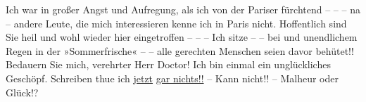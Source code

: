\pstart
           Ich war in großer Angst und {\pb}Aufregung, als ich von der Pariser\label{K_L03695-2v}\label{K_L03695-2} fürchtend – – – na – andere Leute, die mich
               interessieren kenne ich in Paris nicht.
               Hoffentlich sind Sie heil und wohl wieder hier eingetroffen – – – Ich sitze – – bei
                  \label{K_L03695-3v}\label{K_L03695-3} und unendlichem Regen in der »Sommerfrische« – – alle gerechten
               Menschen seien davor behütet!! Bedauern Sie mich, verehrter Herr Doctor! Ich bin
               einmal ein unglückliches Geschöpf. Schreiben thue ich \uline{jetzt}{ }\uline{gar nichts!!} – Kann nicht!! – Malheur oder
               Glück!?\pend
           
